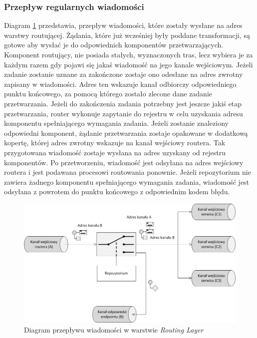 \subsubsection*{Przepływ regularnych wiadomości}
Diagram \ref{fig:routing_layer_project} przedstawia, przepływ wiadomości, które zostały wysłane na adres warstwy routującej. Żądania, które już wcześniej były poddane transformacji, są gotowe aby wysłać je do odpowiednich komponentów przetwarzających. Komponent routujący, nie posiada stałych, wyznaczonych tras, lecz wybiera je za każdym razem gdy pojawi się jakaś wiadomość na jego kanale wejściowym. Jeżeli zadanie zostanie uznane za zakończone zostaje ono odesłane na adres zwrotny zapisany w wiadomości. Adres ten wskazuje kanał odbiorczy odpowiedniego punktu końcowego, za pomocą którego zostało zlecone dane zadanie przetwarzania. Jeżeli do zakończenia zadania potrzebny jest jeszcze jakiś etap przetwarzania, router wykonuje zapytanie do rejestru w celu uzyskania adresu komponentu spełniającego wymagania zadania. Jeżeli zostanie znaleziony odpowiedni komponent, żądanie przetwarzania zostaje opakowane w dodatkową kopertę, której adres zwrotny wskazuje na kanał wejściowy routera. Tak przygotowana wiadomość zostaje wysłana na adres uzyskany od rejestru komponentów. Po przetworzeniu, wiadomość jest odsyłana na adres wejściowy routera i jest podawana procesowi routowania ponownie. Jeżeli repozytorium nie zawiera żadnego komponentu spełniającego wymagania zadania, wiadomość jest odsyłana z powrotem do punktu końcowego z odpowiednim kodem błędu. 

\begin{figure}[!h]
	\centering
	\includegraphics[scale=0.55]{router_flow.png}
	\caption{Diagram przepływu wiadomości w warstwie \textit{Routing Layer}}\label{fig:routing_layer_project}
\end{figure}

